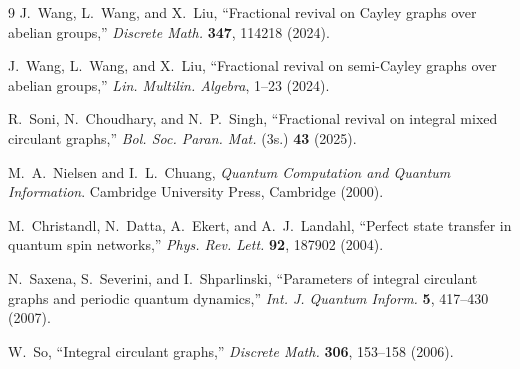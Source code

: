\documentclass[12pt]{amsart}
\begin{document}
\begin{thebibliography}{9}
J.~Wang, L.~Wang, and X.~Liu,
``Fractional revival on Cayley graphs over abelian groups,''
\textit{Discrete Math.} \textbf{347}, 114218 (2024).

J.~Wang, L.~Wang, and X.~Liu,
``Fractional revival on semi-Cayley graphs over abelian groups,''
\textit{Lin. Multilin. Algebra}, 1--23 (2024).

R.~Soni, N.~Choudhary, and N.~P.~Singh,
``Fractional revival on integral mixed circulant graphs,''
\textit{Bol. Soc. Paran. Mat.} (3s.) \textbf{43} (2025).

M.~A.~Nielsen and I.~L.~Chuang,
\textit{Quantum Computation and Quantum Information}.
Cambridge University Press, Cambridge (2000).

M.~Christandl, N.~Datta, A.~Ekert, and A.~J.~Landahl,
``Perfect state transfer in quantum spin networks,''
\textit{Phys. Rev. Lett.} \textbf{92}, 187902 (2004).

N.~Saxena, S.~Severini, and I.~Shparlinski,
``Parameters of integral circulant graphs and periodic quantum dynamics,''
\textit{Int. J. Quantum Inform.} \textbf{5}, 417--430 (2007).

W.~So,
``Integral circulant graphs,''
\textit{Discrete Math.} \textbf{306}, 153--158 (2006).
\end{thebibliography}
 
\end{document}
